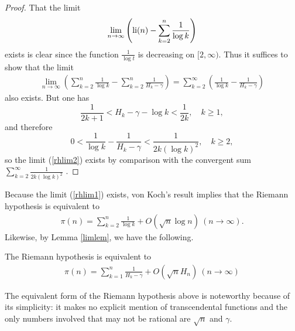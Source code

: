 \documentclass[12pt]{article}
\begin{document}
\begin{proof}
That the limit 
\begin{align}\label{rhlim1}
\lim_{n \to \infty} \left (\operatorname{li}(n) - \sum_{k = 2}^{n} \frac{1}{\log k} \right) 
\end{align}
exists is clear since the function $\frac{1}{\log t}$ is decreasing on $[2,\infty)$.   Thus it suffices to show that the limit
\begin{align}\label{rhlim2}
\lim_{n \to \infty} \left(\sum_{k = 2}^n \frac{1}{\log k} - \sum_{k = 2}^n\frac{1}{H_k-\gamma}\right) = \sum_{k = 2}^\infty \left(\frac{1}{\log k} - \frac{1}{H_k-\gamma}\right)
\end{align}
also exists.  But one has
$$\frac{1}{2k+1} < H_k -\gamma - \log k < \frac{1}{2k}, \quad k \geq 1,$$
and therefore 
 $$0 < \frac{1}{\log k} - \frac{1}{H_k-\gamma}  < \frac{1}{2k (\log k)^2}, \quad k \geq 2,$$
so the limit (\ref{rhlim2}) exists by comparison with the convergent sum $\sum_{k = 2}^\infty \frac{1}{2k (\log k)^2}$ .
\end{proof}

Because the limit (\ref{rhlim1}) exists, von Koch's result implies that the Riemann hypothesis is equivalent to
\begin{align*}
\pi(n) =  \sum_{k = 2}^{n} \frac{1}{\log k}  + O(\sqrt{n} \log n) \ (n \to \infty).
\end{align*}
Likewise, by Lemma \ref{limlem}, we have the following.

\begin{proposition}\label{RHequiv}
The Riemann hypothesis is equivalent to
\begin{align*}
\pi(n) =  \sum_{k = 1}^{n} \frac{1}{H_k -\gamma}  + O(\sqrt{n} H_n) \ (n \to \infty)
\end{align*}
\end{proposition}

The equivalent form of the Riemann hypothesis above is noteworthy because of its simplicity:  it makes no explicit mention of transcendental functions and the only numbers involved that may not be rational are $\sqrt{n}$ and $\gamma$.  %
\end{document}
